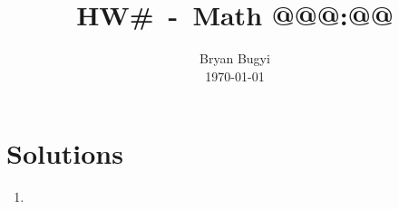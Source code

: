 \documentclass[12pt]{article}
\title{HW#~-~Math @@@:@@\vspace{-0.5cm}}
\author{Bryan Bugyi\\\today}
\date{}
\begin{document}
\maketitle
\section*{Solutions}
\begin{enumerate}
   \item
\end{enumerate}
\end{document}
